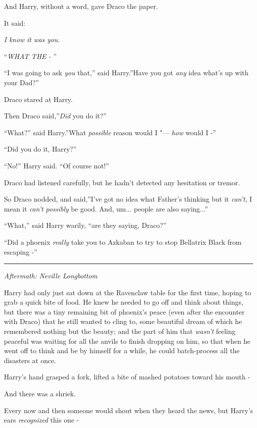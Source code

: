 And Harry, without a word, gave Draco the paper.

It said:

\emph{I know it was you.}

``\emph{WHAT THE -} ''

``I was going to ask \emph{you} that,'' said Harry.''Have you got
\emph{any} idea what's up with your Dad?''

Draco stared at Harry.

Then Draco said,''\emph{Did} you do it?''

``What?'' said Harry.''What \emph{possible} reason would I "--- \emph{how}
would I -''

``Did you do it, Harry?''

``No!'' Harry said. ``Of course not!''

Draco had listened carefully, but he hadn't detected any hesitation or
tremor.

So Draco nodded, and said,''I've got no idea what Father's thinking but
it \emph{can't}, I mean it \emph{can't possibly} be good. And,
um... people are also saying...''

``What,'' said Harry warily, ``are they saying, Draco?''

``Did a phoenix \emph{really} take you to Azkaban to try to stop
Bellatrix Black from escaping -''

\begin{center}\rule{3in}{0.4pt}\end{center}

\emph{Aftermath: Neville Longbottom}

Harry had only just sat down at the Ravenclaw table for the first time,
hoping to grab a quick bite of food. He knew he needed to go off and
think about things, but there was a tiny remaining bit of phoenix's
peace (even after the encounter with Draco) that he still wanted to
cling to, some beautiful dream of which he remembered nothing but the
beauty; and the part of him that \emph{wasn't} feeling peaceful was
waiting for all the anvils to finish dropping on him, so that when he
went off to think and be by himself for a while, he could batch-process
all the disasters at once.

Harry's hand grasped a fork, lifted a bite of mashed potatoes toward his
mouth -

And there was a shriek.

Every now and then someone would shout when they heard the news, but
Harry's ears \emph{recognized} this one -

